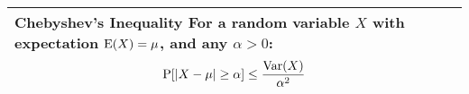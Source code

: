 {\tabulinesep=1mm
\begin{tabu}{|p{16cm} |}
\hline
\vspace{2 mm}
\textbf{Chebyshev's Inequality } \newline
For a random variable $X$ with expectation  $\text{E}(X) = \mu$, and any  
$\alpha > 0$:
\[\text{P}[|X - \mu | \geq \alpha] \leq \frac{\text{Var}(X)}{\alpha^2}\]
\\
\hline
\end{tabu}
}
